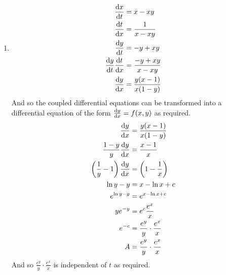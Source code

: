 \documentclass[10pt,\jkfside,a4paper]{article}
\begin{document}
\begin{enumerate}
\begin{enumerate}
\item
\begin{equation}
\begin{split}
\dv{x}{t} &= x - xy\\
\dv{t}{x} &= \frac{1}{x - xy}\\
\dv{y}{t} &= -y + xy\\
\dv{y}{t}\dv{t}{x} &= \frac{-y + xy}{x - xy}\\
\dv{y}{x} &= \frac{y(x - 1)}{x(1 - y)}\\
\end{split}
\end{equation}
And so the coupled differential equations can be transformed into a differential equation of the form 
$\dv{y}{x} = f(x, y)$ as required.
\begin{equation}
\begin{split}
\dv{y}{x} &= \frac{y(x - 1)}{x(1 - y)}\\
\frac{1 - y}{y}\dv{y}{x} &= \frac{x - 1}{x}\\
\left(\frac{1}{y} - 1\right)\dv{y}{x} &= \left(1 - \frac{1}{x}\right)\\
\ln y - y &= x - \ln x + c\\
e^{\ln y - y} &= e^{x - \ln x + c}\\
ye^{-y} &= e^c\frac{e^x}{x}\\
e^{-c} &= \frac{e^y}{y}\cdot \frac{e^x}{x}\\
A &= \frac{e^y}{y}\cdot \frac{e^x}{x}\\
\end{split}
\end{equation}
And so $\frac{e^y}{y}\cdot \frac{e^x}{x}$ is independent of $t$ as required.

\end{enumerate}

\end{enumerate}
\end{document}
